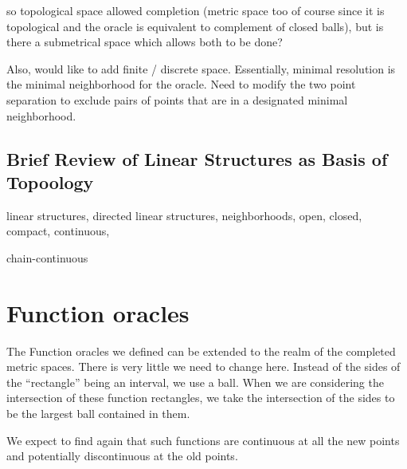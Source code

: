 so topological space allowed completion (metric space too of course since it is topological and the oracle is equivalent to complement of closed balls),  but is there a submetrical space which allows both to be done? 

Also, would like to add finite / discrete space. Essentially, minimal resolution is the minimal neighborhood for the oracle. Need to modify the two point separation to exclude pairs of points that are in a designated minimal neighborhood. 

\subsection{Brief Review of Linear Structures as Basis of Topoology}

linear structures, directed linear structures, neighborhoods, open, closed, compact, continuous, 

chain-continuous



\section{Function oracles}



The Function oracles we defined can be extended to the realm of the completed metric spaces. There is very little we need to change here. Instead of the sides of the ``rectangle'' being an interval, we use a ball. When we are considering the intersection of these function rectangles, we take the intersection of the sides to be the largest ball contained in them. 

We expect to find again that such functions are continuous at all the new points and potentially discontinuous at the old points. 


